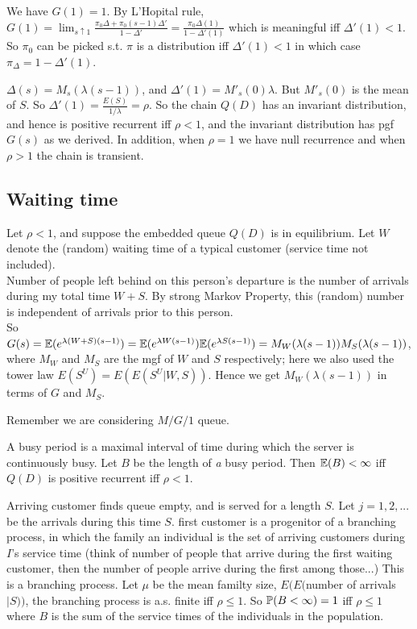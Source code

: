 \documentclass[a4paper]{article}
\begin{document}
We have $G(1) = 1$. By L'Hopital rule, $G(1) = \lim_{s \uparrow 1} \frac{\pi_0 \Delta + \pi_0(s-1)\Delta'}{1-\Delta'} = \frac{\pi_0 \Delta(1)}{1-\Delta'(1)}$ which is meaningful iff $\Delta'(1) < 1$. So $\pi_0$ can be picked s.t. $\pi$ is a distribution iff $\Delta'(1) < 1$ in which case $\pi_\Delta = 1-\Delta'(1)$.

$\Delta(s) = M_s(\lambda(s-1))$, and $\Delta'(1) = M'_s(0) \lambda$. But $M'_s(0)$ is the mean of $S$. So $\Delta'(1) = \frac{E(S)}{1/\lambda} = \rho$. So the chain $Q(D)$ has an invariant distribution, and hence is positive recurrent iff $\rho<1$, and the invariant distribution has pgf $G(s)$ as we derived. In addition, when $\rho=1$ we have null recurrence and when $\rho>1$ the chain is transient.

\subsection{Waiting time}
Let $\rho < 1$, and suppose the embedded queue $Q(D)$ is in equilibrium. Let $W$ denote the (random) waiting time of a typical customer (service time not included).\\
Number of people left behind on this person's departure is the number of arrivals during my total time $W+S$. By strong Markov Property, this (random) number is independent of arrivals prior to this person.\\
So $G(s) = \E(e^{\lambda (W+S) (s-1)}) = \E(e^{\lambda W(s-1)}) \E(e^{\lambda S(s-1)}) = M_W(\lambda(s-1))M_S(\lambda(s-1))$, where $M_W$ and $M_S$ are the mgf of $W$ and $S$ respectively; here we also used the tower law $E(S^U) = E(E(S^U|W,S))$. Hence we get $M_W(\lambda(s-1))$ in terms of $G$ and $M_S$.

Remember we are considering $M/G/1$ queue. 

A busy period is a maximal interval of time during which the server is continuously busy. Let $B$ be the length of \emph{a} busy period. Then $\E(B) < \infty$ iff $Q(D)$ is positive recurrent iff $\rho<1$.

Arriving customer finds queue empty, and is served for a length $S$. Let $j=1,2,...$ be the arrivals during this time $S$. first customer is a progenitor of a branching process, in which the family an individual is the set of arriving customers during $I$'s service time (think of number of people that arrive during the first waiting customer, then the number of people arrive during the first among those...) This is a branching process. Let $\mu$ be the mean familty size, $E(E($number of arrivals$|S))$, the branching process is a.s. finite iff $\rho \leq 1$. So $\P(B<\infty) = 1$ iff $\rho \leq 1$ where $B$ is the sum of the service times of the individuals in the population.
\end{document}
